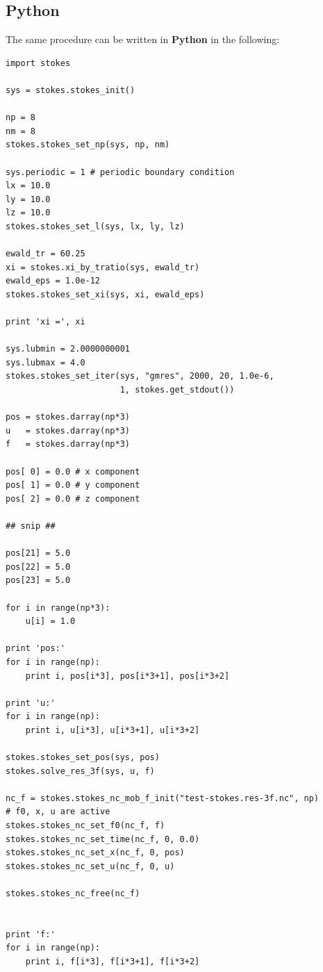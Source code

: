 \documentclass{book}
\begin{document}
\subsection{Python}
The same procedure can be written in {\bf Python}\cite{Python}
in the following:
{\small
\begin{verbatim}
import stokes

sys = stokes.stokes_init()

np = 8
nm = 8
stokes.stokes_set_np(sys, np, nm)

sys.periodic = 1 # periodic boundary condition
lx = 10.0
ly = 10.0
lz = 10.0
stokes.stokes_set_l(sys, lx, ly, lz)

ewald_tr = 60.25
xi = stokes.xi_by_tratio(sys, ewald_tr)
ewald_eps = 1.0e-12
stokes.stokes_set_xi(sys, xi, ewald_eps)

print 'xi =', xi

sys.lubmin = 2.0000000001
sys.lubmax = 4.0
stokes.stokes_set_iter(sys, "gmres", 2000, 20, 1.0e-6,
                       1, stokes.get_stdout())

pos = stokes.darray(np*3)
u   = stokes.darray(np*3)
f   = stokes.darray(np*3)

pos[ 0] = 0.0 # x component
pos[ 1] = 0.0 # y component
pos[ 2] = 0.0 # z component

## snip ##

pos[21] = 5.0
pos[22] = 5.0
pos[23] = 5.0

for i in range(np*3):
    u[i] = 1.0

print 'pos:'
for i in range(np):
    print i, pos[i*3], pos[i*3+1], pos[i*3+2]

print 'u:'
for i in range(np):
    print i, u[i*3], u[i*3+1], u[i*3+2]

stokes.stokes_set_pos(sys, pos)
stokes.solve_res_3f(sys, u, f)

nc_f = stokes.stokes_nc_mob_f_init("test-stokes.res-3f.nc", np)
# f0, x, u are active
stokes.stokes_nc_set_f0(nc_f, f)
stokes.stokes_nc_set_time(nc_f, 0, 0.0)
stokes.stokes_nc_set_x(nc_f, 0, pos)
stokes.stokes_nc_set_u(nc_f, 0, u)

stokes.stokes_nc_free(nc_f)


print 'f:'
for i in range(np):
    print i, f[i*3], f[i*3+1], f[i*3+2]
\end{verbatim}
}
\end{document}
